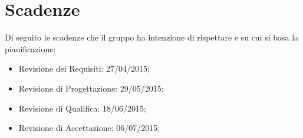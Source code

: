 \section{Scadenze}{
\label{sec:scadenze}
Di seguito le scadenze che il gruppo \gruppo ha intenzione di rispettare e su cui si basa la pianificazione:
\begin{itemize}
	\item Revisione dei Requisiti: 27/04/2015;
	\item Revisione di Progettazione: 29/05/2015;
	\item Revisione di Qualifica: 18/06/2015;
	\item Revisione di Accettazione: 06/07/2015;
\end{itemize}
}